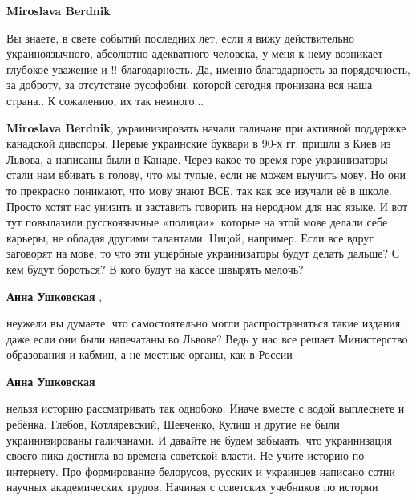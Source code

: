 \begin{itemize}
\begin{itemize}
\textbf{Miroslava Berdnik} 

Вы знаете, в свете событий последних лет, если я вижу действительно
украиноязычного, абсолютно адекватного человека, у меня к нему возникает
глубокое уважение и !! благодарность. Да, именно благодарность за порядочность,
за доброту, за отсутствие русофобии, которой сегодня пронизана вся наша
страна.. К сожалению, их так немного...

 
\textbf{Miroslava Berdnik}, украинизировать начали галичане при активной
поддержке канадской диаспоры. Первые украинские буквари в 90-х гг. пришли в
Киев из Львова, а написаны были в Канаде. Через какое-то время
горе-украинизаторы стали нам вбивать в голову, что мы тупые, если не можем
выучить мову. Но они то прекрасно понимают, что мову знают ВСЕ, так как все
изучали её в школе. Просто хотят нас унизить и заставить говорить на неродном
для нас языке. И вот тут повылазили русскоязычные «полицаи», которые на этой
мове делали себе карьеры, не обладая другими талантами. Ницой, например. Если
все вдруг заговорят на мове, то что эти ущербные украинизаторы будут делать
дальше? С кем будут бороться? В кого будут на кассе швырять мелочь?


 
\textbf{Анна Ушковская} , 

неужели вы думаете, что самостоятельно могли распространяться такие издания,
даже если они были напечатаны во Львове? Ведь у нас все решает Министерство
образования и кабмин, а не местные органы, как в России


 
\textbf{Анна Ушковская} 

нельзя историю рассматривать так однобоко. Иначе вместе с водой выплеснете и
ребёнка. Глебов, Котляревский, Шевченко, Кулиш и другие не были украинизированы
галичанами. И давайте не будем забыаать, что украинизация своего пика достигла
во времена советской власти. Не учите историю по интернету. Про формирование
белорусов, русских и украинцев написано сотни научных академических трудов.
Начиная с советских учебников по истории


\end{itemize}
\end{itemize}

